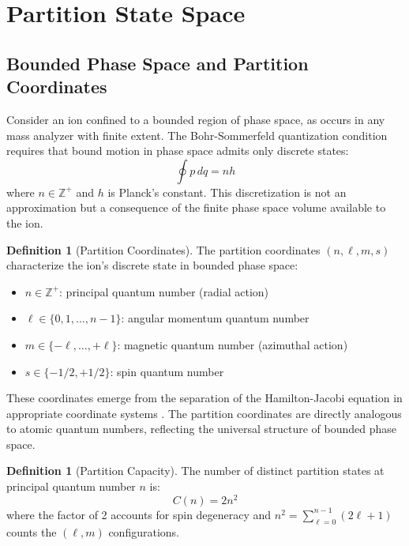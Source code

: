 \documentclass[twocolumn,10pt,a4paper]{article}
\theoremstyle{definition}
\newtheorem{definition}[theorem]{Definition}
\theoremstyle{remark}
\begin{document}
\section{Partition State Space}
\label{sec:partition_space}

\subsection{Bounded Phase Space and Partition Coordinates}

Consider an ion confined to a bounded region of phase space, as occurs in any mass analyzer with finite extent. The Bohr-Sommerfeld quantization condition \citep{landau1977} requires that bound motion in phase space admits only discrete states:
\begin{equation}
    \oint p \, dq = n h
    \label{eq:bohr_sommerfeld}
\end{equation}
where $n \in \mathbb{Z}^+$ and $h$ is Planck's constant. This discretization is not an approximation but a consequence of the finite phase space volume available to the ion.

\begin{definition}[Partition Coordinates]
\label{def:partition_coords}
The partition coordinates $(n, \ell, m, s)$ characterize the ion's discrete state in bounded phase space:
\begin{itemize}
    \item $n \in \mathbb{Z}^+$: principal quantum number (radial action)
    \item $\ell \in \{0, 1, \ldots, n-1\}$: angular momentum quantum number
    \item $m \in \{-\ell, \ldots, +\ell\}$: magnetic quantum number (azimuthal action)
    \item $s \in \{-1/2, +1/2\}$: spin quantum number
\end{itemize}
\end{definition}

These coordinates emerge from the separation of the Hamilton-Jacobi equation in appropriate coordinate systems \citep{goldstein2002}. The partition coordinates are directly analogous to atomic quantum numbers, reflecting the universal structure of bounded phase space.

\begin{definition}[Partition Capacity]
\label{def:capacity}
The number of distinct partition states at principal quantum number $n$ is:
\begin{equation}
    C(n) = 2n^2
    \label{eq:capacity}
\end{equation}
where the factor of 2 accounts for spin degeneracy and $n^2 = \sum_{\ell=0}^{n-1}(2\ell + 1)$ counts the $(\ell, m)$ configurations.
\end{definition}
\end{document}
